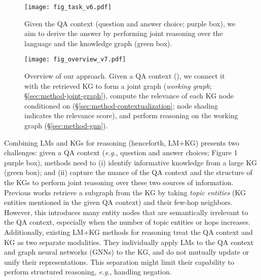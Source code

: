 \documentclass[11pt]{article}
\newcommand{\eg}{\textit{e.g.}}
\begin{document}
\begin{figure}[!t]
    \centering
    \texttt{[image: fig\_task\_v6.pdf]}\vspace{-2mm}
    \caption{Given the QA context (question and answer choice; purple box), we aim to derive the answer by performing joint reasoning over the language and the knowledge graph (green box). 
    }
\label{fig:task}
\end{figure}


\begin{figure*}[!th]
    \vspace{-2mm}
    \centering \texttt{[image: fig\_overview\_v7.pdf]}
    \vspace{-1mm}
    \caption{Overview of our approach. Given a QA context (), 
    we connect it with the retrieved KG to form a joint graph (\textit{working graph}; \S \ref{sec:method-joint-graph}), compute the relevance of each KG node conditioned on  (\S \ref{sec:method-contextualization}; node shading indicates the relevance score), and perform reasoning on the working graph (\S \ref{sec:method-gnn}). 
    }\label{fig:overview}
\end{figure*}



Combining LMs and KGs for reasoning (henceforth, LM+KG) presents two challenges: given a QA context (\eg, question and answer choices; Figure 1 purple box), methods need to (i) identify informative knowledge from a large KG (green box); and (ii) capture the nuance of the QA context and the structure of the KGs to perform joint reasoning over these two sources of information. 
Previous works \cite{bao2016constraint,sun2018open,lin2019kagnet} retrieve a subgraph from the KG by taking \textit{topic entities} (KG entities mentioned in the given QA context) and their few-hop neighbors. However, this introduces many entity nodes that are semantically irrelevant to the QA context, especially when the number of topic entities or hops increases. 
Additionally, existing LM+KG methods for reasoning \cite{lin2019kagnet,wang2019improving,feng2020scalable,lv2020graph} treat the QA context and KG as two separate modalities. They individually apply LMs to the QA context and graph neural networks (GNNs) to the KG, and do not mutually update or unify their representations. This separation might limit their capability to perform structured reasoning, \eg, handling negation.
\end{document}
